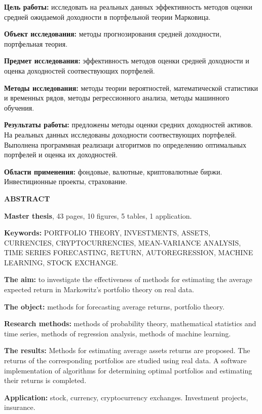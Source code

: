     \textbf{Цель работы:}
    исследовать на реальных данных эффективность методов оценки средней ожидаемой доходности в портфельной теории Марковица.

    \textbf{Объект исследования:} 
    методы прогнозирования средней доходности, портфельная теория.

    \textbf{Предмет исследования:}
    эффективность методов оценки средней доходности и оценка доходностей соотвествующих портфелей.

    \textbf{Методы исследования:}
    методы теории вероятностей, математической статистики и временных рядов, методы регрессионного анализа, методы машинного обучения.

    \textbf{Результаты работы:}
    предложены методы оценки средних доходностей активов. На реальных данных исследованы доходности соотвествующих портфелей.
    Выполнена программная реализаци алгоритмов по определению оптимальных портфелей и оценка их доходностей.

    \textbf{Области применения:}
    фондовые, валютные, криптовалютные биржи. Инвестиционные проекты, страхование.

\newpage

\begin{center}
    \textbf{ABSTRACT}
\end{center}

\textbf{Master thesis}, 43 pages, 10 figures, 5 tables, 1 application.

\textbf{Keywords:}
PORTFOLIO THEORY, INVESTMENTS, ASSETS, CURRENCIES, CRYPTOCURRENCIES, MEAN-VARIANCE ANALYSIS, 
TIME SERIES FORECASTING, RETURN, AUTOREGRESSION, MACHINE LEARNING, STOCK EXCHANGE.

\textbf{The aim:}
to investigate the effectiveness of methods for estimating the average expected return in Markowitz's portfolio theory on real data.

\textbf{The object:}
methods for forecasting average returns, portfolio theory.

\textbf{Research methods:} 
methods of probability theory, mathematical statistics and time series, methods of regression analysis, methods of machine learning.

\textbf{The results:}
Methods for estimating average assets returns are proposed. 
The returns of the corresponding portfolios are studied using real data. 
A software implementation of algorithms for determining optimal portfolios and estimating their returns is completed.

\textbf{Application:}
stock, currency, cryptocurrency exchanges. Investment projects, insurance.

